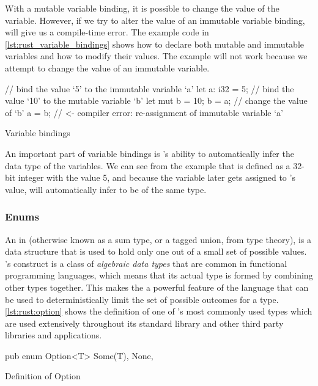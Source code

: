 With a mutable variable binding, it is possible to change the value of the variable.
However, if we try to alter the value of an immutable variable binding, {\rust} will give us a compile-time error.
The example code in \autoref{lst:rust_variable_bindings} shows how to declare both mutable and immutable variables and how to modify their values.
The example will not work because we attempt to change the value of an immutable variable.

\begin{listing}[H]
  \begin{rustcode}
// bind the value `5' to the immutable variable `a'
let a: i32 = 5;
// bind the value `10' to the mutable variable `b'
let mut b = 10;
b = a; // change the value of `b'
a = b; // <- compiler error: re-assignment of immutable variable `a'
  \end{rustcode}
  \caption{Variable bindings}
  \label{lst:rust_variable_bindings}
\end{listing}

An important part of variable bindings is {\rust}'s ability to automatically infer the data type of the variables.
We can see from the example that  is defined as a 32-bit integer with the value 5, and because the variable  later gets assigned to 's value, {\rust} will automatically infer  to be of the same type.

\subsubsection{Enums}

An {\enum} in {\rust} (otherwise known as a sum type, or a tagged union, from type theory), is a data structure that is used to hold only one out of a small set of possible values.
\rust's {\enum} construct is a class of \emph{algebraic data types} that are common in functional programming languages, which means that its actual type is formed by combining other types together.
This makes the {\enum} a powerful feature of the language that can be used to deterministically limit the set of possible outcomes for a type.
\autoref{lst:rust:option} shows the definition of one of {\rust}'s most commonly used types which are used extensively throughout its standard library and other third party libraries and applications.

\begin{listing}[H]
  \begin{rustcode}
pub enum Option<T> {
  Some(T),
  None,
}
  \end{rustcode}
  \caption{Definition of Option}
  \label{lst:rust:option}
\end{listing}

